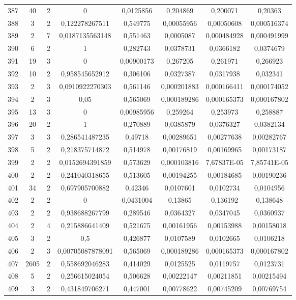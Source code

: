 \begin{longtable}{|c|c|c|c|c|c|c|c|}
387 & 40 & 2 & 0 & 0,0125856 & 0,204869 & 0,200071 & 0,20363  \\
388 & 3 & 2 & 0,122278267511 & 0,549775 & 0,00055956 & 0,00050608 & 0,000516374  \\
389 & 2 & 7 & 0,0187135563148 & 0,551463 & 0,0005087 & 0,000484928 & 0,000491999  \\
390 & 6 & 2 & 1 & 0,282743 & 0,0378731 & 0,0366182 & 0,0374679  \\
391 & 19 & 3 & 0 & 0,00900173 & 0,267205 & 0,261971 & 0,266923  \\
392 & 10 & 2 & 0,958545652912 & 0,306106 & 0,0327387 & 0,0317938 & 0,032341  \\
393 & 2 & 3 & 0,0910922270303 & 0,561146 & 0,000201883 & 0,000166411 & 0,000174052  \\
394 & 2 & 3 & 0,05 & 0,565069 & 0,000189286 & 0,000165373 & 0,000167802  \\
395 & 13 & 3 & 0 & 0,00985956 & 0,259264 & 0,253973 & 0,258887  \\
396 & 20 & 2 & 1 & 0,270889 & 0,0385879 & 0,0376327 & 0,0382134  \\
397 & 3 & 3 & 0,286541487235 & 0,49718 & 0,00289651 & 0,00277638 & 0,00282767  \\
398 & 5 & 2 & 0,218375714872 & 0,514978 & 0,00176819 & 0,00169965 & 0,00173187  \\
399 & 2 & 2 & 0,0152694391859 & 0,573629 & 0,000103816 & 7,67837E-05 & 7,85741E-05  \\
400 & 2 & 2 & 0,241040318655 & 0,513605 & 0,00194255 & 0,00184685 & 0,00190236  \\
401 & 34 & 2 & 0,697905700882 & 0,42346 & 0,0107601 & 0,0102734 & 0,0104956  \\
402 & 2 & 2 & 0 & 0,0431004 & 0,13865 & 0,136192 & 0,138648  \\
403 & 2 & 2 & 0,938688267799 & 0,289546 & 0,0364327 & 0,0347045 & 0,0360937  \\
404 & 2 & 4 & 0,215886641409 & 0,521675 & 0,00161956 & 0,00153988 & 0,00158018  \\
405 & 3 & 2 & 0,5 & 0,426877 & 0,0107589 & 0,0102665 & 0,0106218  \\
406 & 2 & 3 & 0,00705087878091 & 0,565069 & 0,000189286 & 0,000165373 & 0,000167802  \\
407 & 2605 & 2 & 0,558692046283 & 0,414029 & 0,0125525 & 0,0119757 & 0,0123731  \\
408 & 5 & 2 & 0,256615024054 & 0,506628 & 0,00222147 & 0,00211851 & 0,00215494  \\
409 & 3 & 2 & 0,431849706271 & 0,447001 & 0,00778622 & 0,00745209 & 0,00769754  \\

\end{longtable}
